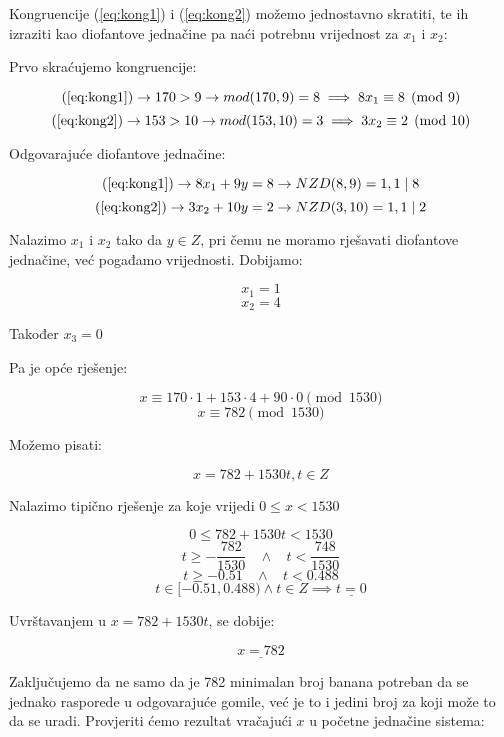 \documentclass[12pt]{article}
\begin{document}
Kongruencije (\ref{eq:kong1}) i (\ref{eq:kong2}) možemo jednostavno skratiti, te ih izraziti kao diofantove jednačine pa naći potrebnu vrijednost za $x_{1}$ i $x_{2}$:

Prvo skraćujemo kongruencije:

$$(\ref{eq:kong1}) \to 170 > 9 \to mod(170, 9) = 8 \implies 8x_{1} \equiv 8 \pmod{9}$$
$$(\ref{eq:kong2}) \to 153 > 10 \to mod(153, 10) = 3 \implies 3x_{2} \equiv 2 \pmod{10}$$\vspace{1mm}

Odgovarajuće diofantove jednačine:

$$(\ref{eq:kong1}) \to 8x_{1} + 9y = 8 \to NZD(8, 9) = 1, 1 \mid 8$$
$$(\ref{eq:kong2}) \to 3x_{2} + 10y = 2 \to NZD(3, 10) = 1, 1 \mid 2$$\vspace{1mm}

Nalazimo $x_{1}$ i $x_{2}$ tako da $y \in Z$, pri čemu ne moramo rješavati diofantove jednačine, već pogađamo vrijednosti. Dobijamo:

$$x_{1} = 1$$
$$x_{2} = 4$$
\begin{center}
Također $x_{3} = 0$
\end{center}

Pa je opće rješenje:

$$x \equiv 170 \cdot 1 + 153 \cdot 4 + 90 \cdot 0 \pmod{1530}$$
$$x \equiv 782 \pmod{1530}$$

Možemo pisati:

$$x = 782 + 1530t, t\in Z$$\vspace{1mm}

Nalazimo tipično rješenje za koje vrijedi $0 \leq x < 1530$

$$0 \leq 782 + 1530t < 1530$$\vspace{1mm}
$$t \geq - \frac{782}{1530} \>\>\>\> \land \>\>\>\> t < \frac{748}{1530}$$\vspace{1mm}
$$t \geq - 0.51 \>\>\>\> \land \>\>\>\> t < 0.488$$\vspace{1mm}
$$t\in [-0.51, 0.488) \land t \in Z \implies \underline{t = 0}$$\vspace{1mm}

Uvrštavanjem u $x = 782 + 1530t$, se dobije:

$$\underline{x = 782}$$\vspace{1mm}

Zaključujemo da ne samo da je 782 minimalan broj banana potreban da se jednako rasporede u odgovarajuće gomile, već je to i jedini broj za koji može to da se uradi. Provjeriti ćemo rezultat vračajući $x$ u početne jednačine sistema:
\end{document}
